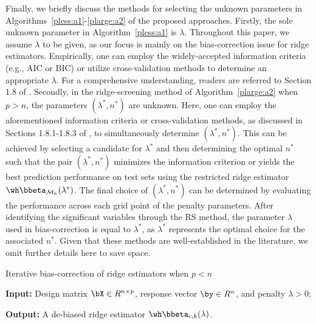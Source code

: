 Finally, we briefly discuss the methods for selecting the unknown parameters in Algorithms~\ref{pless:a1}-\ref{plarge:a2} of the proposed approaches. Firstly, the sole unknown parameter in Algorithm~\ref{pless:a1} is $\lambda$. Throughout this paper, we assume $\lambda$ to be given, as our focus is mainly on the bias-correction issue for ridge estimators. Empirically, one can employ the widely-accepted information criteria (e.g., AIC or BIC) or utilize cross-validation methods to determine an appropriate $\lambda$. For a comprehensive understanding, readers are referred to Section 1.8 of \cite{van2023lecture}. Secondly, in the ridge-screening method of Algorithm~\ref{plarge:a2} when $p>n$, the parameters $(\lambda^*,n^*)$ are unknown. Here, one can employ the aforementioned information criteria or cross-validation methods, as discussed in Sections 1.8.1-1.8.3 of \cite{van2023lecture}, to simultaneously determine $(\lambda^*,n^*)$. This can be achieved by selecting a candidate for 
$\lambda^*$ and then determining the optimal $n^*$ such that the pair 
$(\lambda^*,n^*)$ minimizes the information criterion or yields the best prediction performance on test sets using the restricted ridge estimator $\wh\bbeta_{\mathcal{M}_k}(\lambda^*)$. The final choice of 
$(\lambda^*,n^*)$ can be determined by evaluating the performance across each grid point of the penalty parameters. After identifying the significant variables through the RS method, the parameter $\lambda$ used in bias-correction is equal to 
$\lambda^*$, as 
$\lambda^*$ represents the optimal choice for the associated 
$n^*$. Given that these methods are well-established in the literature, we omit further details here to save space.






\begin{algorithm}[ht]
\caption{Iterative bias-correction of ridge estimators when $p<n$}\label{pless:a1}
{\bf Input:} Design matrix $\bX\in R^{n\times p}$, response vector $\by\in R^{n}$, and penalty $\lambda>0$;
\begin{algorithmic}[1]
\EndWhile
{}
\end{algorithmic}
{\bf Output:} A de-biased ridge estimator $\wh\bbeta_{c,k}(\lambda)$.
\end{algorithm}


